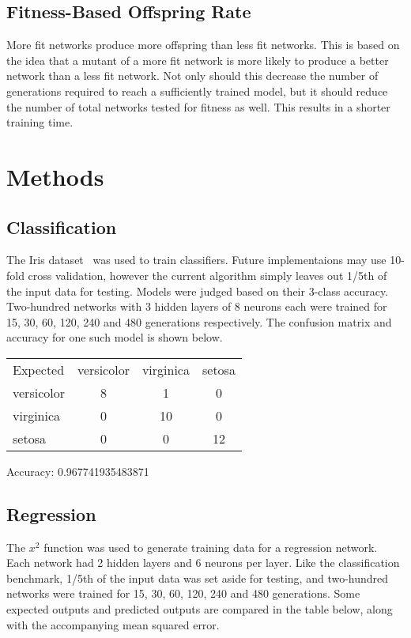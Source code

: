 \documentclass[twocolumn]{article}
\begin{document}
\subsection{Fitness-Based Offspring Rate}

More fit networks produce more offspring than less fit networks. This is based on the idea that a mutant of a more fit network is more likely to produce a better network than a less fit network. Not only should this decrease the number of generations required to reach a sufficiently trained model, but it should reduce the number of total networks tested for fitness as well. This results in a shorter training time.

\section{Methods}
\subsection{Classification}

The Iris dataset~\cite{IrisDataset} was used to train classifiers. Future implementaions may use 10-fold cross validation, however the current algorithm simply leaves out 1/5th of the input data for testing. Models were judged based on their 3-class accuracy. Two-hundred networks with 3 hidden layers of 8 neurons each were trained for 15, 30, 60, 120, 240 and 480 generations respectively. The confusion matrix and accuracy for one such model is shown below.

\begin{center}
\begin{tabular}{ l c c c }
Expected & versicolor & virginica & setosa \\
versicolor & 8 & 1 & 0 \\ 
virginica & 0 & 10 & 0 \\
setosa & 0 & 0 & 12
\end{tabular}
\end{center}

Accuracy: 0.967741935483871

\subsection{Regression}
The $x^2$ function was used to generate training data for a regression network. Each network had 2 hidden layers and 6 neurons per layer. Like the classification benchmark, 1/5th of the input data was set aside for testing, and two-hundred networks were trained for 15, 30, 60, 120, 240 and 480 generations. Some expected outputs and predicted outputs are compared in the table below, along with the accompanying mean squared error.
\end{document}
